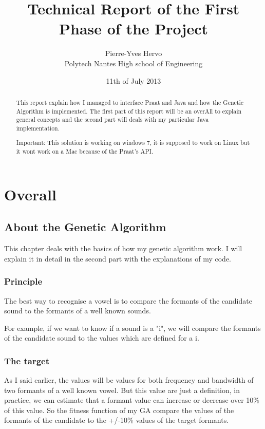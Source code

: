 \documentclass[12pt]{report}
\title{Technical Report of the First Phase of the Project}
\author{Pierre-Yves Hervo \\Polytech Nantes High school of Engineering }
\date{11th  of July 2013}
\begin{document}
\maketitle

\begin{abstract}
This report explain how I managed to interface Praat and Java and how the Genetic Algorithm is implemented. The first part of this report will be an overAll to explain general concepts and the second part will deals with my particular Java implementation.

Important: This solution is working on windows 7, it is supposed to work on Linux but it wont work on a Mac because of the Praat's API.

\end{abstract}

\tableofcontents

\part{Overall}

\chapter{About the Genetic Algorithm}
This chapter deals with the basics of how my genetic algorithm work. I will explain it in detail in the second part with the explanations of my code.

\section{Principle}
The best way to recognise a vowel is to compare the formants of the candidate sound to the formants of a well known sounds.

For example, if we want to know if a sound is a "i", we will compare the formants of the candidate sound to the values which are defined for a i.

\section{The target}
As I said earlier, the values will be values for both frequency and bandwidth of two formants of a well known vowel. But this value are just a definition, in practice, we can estimate that a formant value can increase or decrease over 10\% of this value. So the fitness function of my GA compare the values of the formants of the candidate to the +/-10\% values of the target formants.
\end{document}
